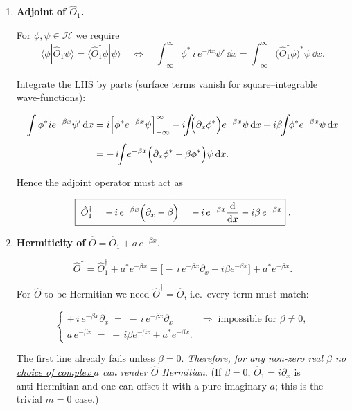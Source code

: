 \documentclass[12pt]{article}
\begin{document}
\begin{enumerate}[label=\textbf{\alph*)},itemsep=1.5\baselineskip]

\item \textbf{Adjoint of $\hat O_{1}$.}

For $\phi,\psi\!\in\!\mathcal H$ we require
\[
\langle\phi|\hat O_{1}\psi\rangle=\langle\hat O_{1}^{\dagger}\phi|\psi\rangle
\quad\Longleftrightarrow\quad
\int_{-\infty}^{\infty}\! \phi^{*}\,
i\,e^{-\beta x}\psi'\,\dd x
= \int_{-\infty}^{\infty}\!\!
\bigl(\hat O_{1}^{\dagger}\phi\bigr)^{*}\psi\,\dd x.
\]

Integrate the LHS by parts (surface terms vanish for square–integrable
wave‑functions):

\begin{align*}
\int \phi^{*}i e^{-\beta x}\psi'\,\dd x
&= i\Bigl[\phi^{*}e^{-\beta x}\psi\Bigr]_{-\infty}^{\infty}
  - i\!\!\int\!\!\Bigl(\partial_{x}\phi^{*}\Bigr)e^{-\beta x}\psi\,\dd x
  + i\beta\!\!\int\!\!\phi^{*}e^{-\beta x}\psi\,\dd x \\[4pt]
&= -\,i\!\!\int\!e^{-\beta x}\Bigl(\partial_{x}\phi^{*}-\beta\phi^{*}\Bigr)\psi\,\dd x .
\end{align*}

Hence the adjoint operator must act as

\[
\boxed{\;
\hat O_{1}^{\dagger}
= -\,i\,e^{-\beta x}\Bigl(\partial_{x}-\beta\Bigr)
= -\,i\,e^{-\beta x}\frac{\dd}{\dd x}
      - i\beta\,e^{-\beta x}}\;.
\]

\item \textbf{Hermiticity of }$\displaystyle\hat O=\hat O_{1}+a\,e^{-\beta x}$.

\[
\hat O^{\dagger}
= \hat O_{1}^{\dagger}+a^{*}e^{-\beta x}
= \bigl[-\,i\,e^{-\beta x}\partial_{x}-i\beta e^{-\beta x}\bigr]
  + a^{*}e^{-\beta x}.
\]

For $\hat O$ to be Hermitian we need $\hat O^{\dagger}=\hat O$,
i.e.\ every term must match:

\[
\begin{cases}
\displaystyle +\,i\,e^{-\beta x}\partial_{x}\;=\;
           -\,i\,e^{-\beta x}\partial_{x}
           &\Longrightarrow\; \text{impossible for }\beta\neq 0,\\[6pt]
\displaystyle a\,e^{-\beta x}\;=\;-\,i\beta e^{-\beta x}+a^{*}e^{-\beta x}.
\end{cases}
\]

The first line already fails unless $\beta=0$.
\emph{Therefore, for any non‑zero real $\beta$ \underline{no choice of
complex $a$} can render $\hat O$ Hermitian}.  
(If $\beta=0$, $\hat O_{1}=i\partial_{x}$ is anti‑Hermitian
and one can offset it with a pure‑imaginary $a$; this is the trivial
$m=0$ case.)


\end{enumerate}
\end{document}

